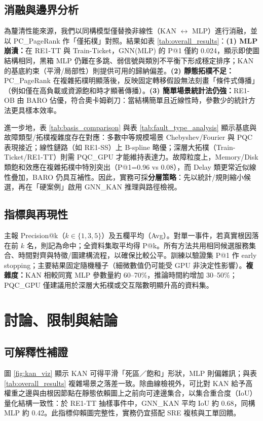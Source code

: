 \documentclass[conference]{IEEEtran}
\begin{document}
\subsection{消融與邊界分析}
為釐清性能來源，我們以同構模型僅替換非線性（KAN $\leftrightarrow$ MLP）進行消融，並以 PC\_PageRank 作「僅拓樸」對照。結果如表 \ref{tab:overall_results}：\textbf{(1) MLP 崩潰：}在 RE1-TT 與 Train-Ticket，GNN(MLP) 的 P@1 僅約 0.024，顯示即使圖結構相同，黑箱 MLP 仍難在多跳、弱信號與類別不平衡下形成穩定排序；KAN 的基底約束（平滑/局部性）則提供可用的歸納偏差。\textbf{(2) 靜態拓樸不足：}PC\_PageRank 在複雜拓樸明顯落後，反映固定轉移假設無法刻畫「條件式傳播」（例如僅在高負載或資源飽和時才顯著傳播）。\textbf{(3) 簡單場景統計法仍強：}RE1-OB 由 BARO 佔優，符合奧卡姆剃刀：當結構簡單且近線性時，參數少的統計方法更具樣本效率。

進一步地，表 \ref{tab:basis_comparison} 與表 \ref{tab:fault_type_analysis} 顯示基底與故障類型/拓樸複雜度存在對應：多數中等規模場景 Chebyshev/Fourier 與 PQC 表現接近；線性鏈路（如 RE1-SS）上 B-spline 略優；深層大拓樸（Train-Ticket/RE1-TT）則需 PQC\_GPU 才能維持表達力。故障粒度上，Memory/Disk 類飽和效應在複雜拓樸中特別突出（P@1=0.96 vs 0.08），而 Delay 類更常近似線性疊加，BARO 仍具互補性。因此，實務可採\textbf{分層策略}：先以統計/規則縮小候選，再在「硬案例」啟用 GNN\_KAN 推理與路徑檢視。

\subsection{指標與再現性}
主報 Precision@k（$k \in \{1,3,5\}$）及五欄平均（Avg）。對單一事件，若真實根因落在前 $k$ 名，則記為命中；全資料集取平均得 P@k。所有方法共用相同候選服務集合、時間對齊與特徵/圖建構流程，以確保比較公平。訓練以驗證集 P@1 作 early stopping；主要結果固定隨機種子（細微數值仍可能受 GPU 非決定性影響）。\textbf{複雜度：}KAN 相較同寬 MLP 參數量約 60--70\%，推論時間約增加 30--50\%；PQC\_GPU 僅建議用於深層大拓樸或交互階數明顯升高的資料集。

\section{討論、限制與結論}

\subsection{可解釋性補證}
圖 \ref{fig:kan_viz} 顯示 KAN 可得平滑「死區／飽和」形狀，MLP 則偏雜訊；與表 \ref{tab:overall_results} 複雜場景之落差一致。除曲線檢視外，可比對 KAN 給予高權重之邊與由根因節點在靜態依賴圖上之前向可達邊集合，以集合重合度（IoU）量化結構一致性：於 RE1-TT 抽樣事件中，GNN\_KAN 平均 IoU 約 0.68，同構 MLP 約 0.42。此指標仰賴圖完整性，實務仍宜搭配 SRE 複核與工單回饋。
\end{document}
